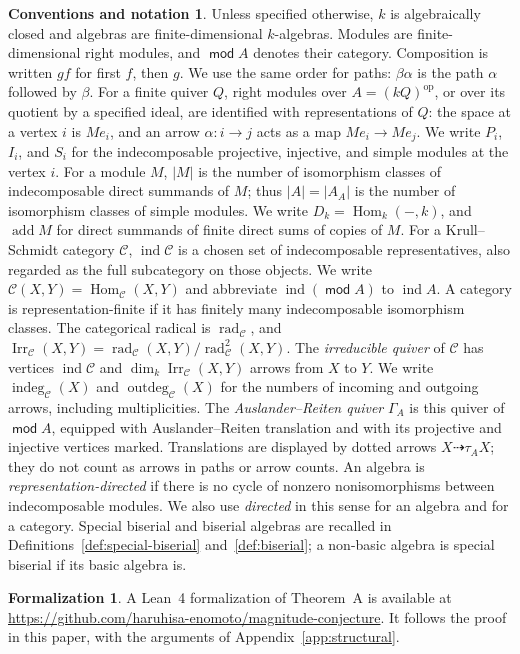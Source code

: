 \documentclass[a4paper,reqno,10pt]{amsart}
\theoremstyle{definition}
\newtheorem*{conventions}{Conventions and notation}
\newtheorem*{formalization}{Formalization}
\numberwithin{equation}{section}
\DeclareMathOperator{\moduleCategory}{\mathsf{mod}}
\renewcommand{\mod}{\moduleCategory}
\DeclareMathOperator{\ind}{ind}
\DeclareMathOperator{\add}{add}
\DeclareMathOperator{\Hom}{Hom}
\DeclareMathOperator{\Irr}{Irr}
\DeclareMathOperator{\rad}{rad}
\newcommand{\op}{\mathrm{op}}
\newcommand{\cC}{\mathcal C}
\newcommand{\Dk}{D_k}
\newcommand{\indeg}{\operatorname{indeg}}
\newcommand{\outdeg}{\operatorname{outdeg}}
\begin{document}
\begin{conventions}
Unless specified otherwise, \(k\) is algebraically closed and algebras are
finite-dimensional \(k\)-algebras. Modules are finite-dimensional right modules, and
\(\mod A\) denotes their category. Composition is written
\(gf\) for first \(f\), then \(g\). We use the same order for paths:
\(\beta\alpha\) is the path \(\alpha\) followed by \(\beta\). For a finite
quiver \(Q\), right modules over \(A=(kQ)^{\op}\), or over its quotient by
a specified ideal, are identified
with representations of \(Q\): the space at a
vertex \(i\) is \(Me_i\), and an arrow \(\alpha:i\to j\) acts as a map
\(Me_i\to Me_j\). We write \(P_i\), \(I_i\), and \(S_i\) for the
indecomposable projective, injective, and simple modules at the vertex
\(i\). For a module \(M\), \(|M|\) is the number
of isomorphism classes of indecomposable direct summands of \(M\); thus
\(|A|=|A_A|\) is the number of isomorphism classes of simple modules.
We write \(\Dk=\Hom_k(-,k)\), and
\(\add M\) for direct summands of finite direct sums of copies of \(M\).
For a Krull--Schmidt category \(\cC\), \(\ind\cC\) is a chosen set
of indecomposable representatives, also regarded as the full subcategory
on those objects. We write \(\cC(X,Y)=\Hom_{\cC}(X,Y)\) and abbreviate
\(\ind(\mod A)\) to \(\ind A\). A category is representation-finite
if it has finitely many indecomposable isomorphism classes.
The categorical radical is \(\rad_{\cC}\), and
\(\Irr_{\cC}(X,Y)=\rad_{\cC}(X,Y)/\rad_{\cC}^2(X,Y)\).
The \emph{irreducible quiver} of \(\cC\) has vertices \(\ind\cC\)
and \(\dim_k\Irr_{\cC}(X,Y)\) arrows from \(X\) to \(Y\).
We write \(\indeg_{\cC}(X)\) and \(\outdeg_{\cC}(X)\) for the
numbers of incoming and outgoing arrows, including multiplicities.
The \emph{Auslander--Reiten quiver} \(\Gamma_A\) is this
quiver of \(\mod A\), equipped with Auslander--Reiten translation and
with its projective and injective vertices marked.
Translations are displayed by dotted arrows
\(X\dashrightarrow\tau_A X\); they do not count as arrows in paths
or arrow counts.
An algebra is \emph{representation-directed} if there is no cycle of
nonzero nonisomorphisms between indecomposable modules. We also use
\emph{directed} in this sense for an algebra and for a category.
Special biserial and biserial algebras are recalled in
Definitions~\ref{def:special-biserial} and~\ref{def:biserial}; a non-basic
algebra is special biserial if its basic algebra is.
\end{conventions}

\begin{formalization}
A Lean~4 formalization of Theorem~A is available at
\url{https://github.com/haruhisa-enomoto/magnitude-conjecture}.
It follows the proof in this paper, with the arguments of
Appendix~\ref{app:structural}.
\end{formalization}
\end{document}
